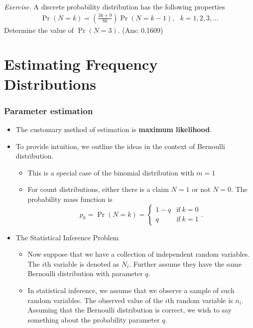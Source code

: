 \documentclass[]{book}
\begin{document}
\emph{Exercise.} A discrete probability distribution has the following
properties \[\begin{aligned}
\Pr(N=k) = \left( \frac{3k+9}{8k}\right) \Pr(N=k-1), ~~~k=1,2,3,\ldots\end{aligned}\]
Determine the value of \(\Pr(N=3)\). (Ans: 0.1609)

\section{Estimating Frequency
Distributions}\label{estimating-frequency-distributions}

\subsubsection{Parameter estimation}\label{parameter-estimation}

\begin{itemize}
\item
  The customary method of estimation is \textbf{maximum likelihood}.
\item
  To provide intuition, we outline the ideas in the context of Bernoulli
  distribution.

  \begin{itemize}
  \item
    This is a special case of the binomial distribution with \(m=1\)
  \item
    For count distributions, either there is a claim \(N=1\) or not
    \(N=0\). The probability mass function is
    \[p_k = \Pr (N=k) = \left\{ \begin{array}{ll}
    1-q & \mathrm{if}\ k=0 \\
    q& \mathrm{if}\ k=1
    \end{array} \right. .\]
  \end{itemize}
\item
  The Statistical Inference Problem

  \begin{itemize}
  \item
    Now suppose that we have a collection of independent random
    variables. The \(i\)th variable is denoted as \(N_i\). Further
    assume they have the same Bernoulli distribution with parameter
    \(q\).
  \item
    In statistical inference, we assume that we observe a sample of such
    random variables. The observed value of the \(i\)th random variable
    is \(n_i\). Assuming that the Bernoulli distribution is correct, we
    wish to say something about the probability parameter \(q\).
  \end{itemize}
\end{itemize}
\end{document}
